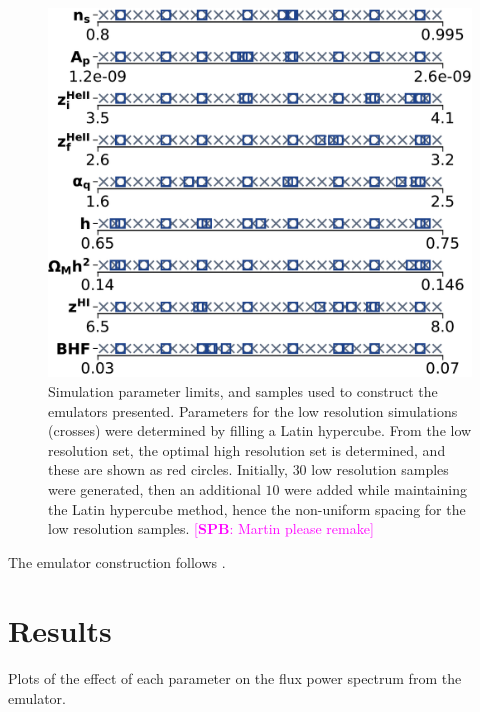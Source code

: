 \documentclass[a4paper,11pt]{article}
\newcommand{\spb}[1]{{\textcolor{magenta}{[{\bf SPB}: #1]}}}
\begin{document}
\begin{figure}
    \centering
	\includegraphics[width=\columnwidth]{figures/120box_42samples.pdf}
    \caption{Simulation parameter limits, and samples used to construct the emulators presented.
    Parameters for the low resolution simulations (crosses) were determined by filling a Latin hypercube.
    From the low resolution set, the optimal high resolution set is determined, and these are shown as red circles.
    Initially, $30$ low resolution samples were generated, then an additional $10$ were added while maintaining the Latin hypercube method, hence the non-uniform spacing for the low resolution samples. \spb{Martin please remake}}
    \label{fig:samples}
\end{figure}

The emulator construction follows \cite{Bird:2019}.

\section{Results}

Plots of the effect of each parameter on the flux power spectrum from the emulator.
\end{document}
